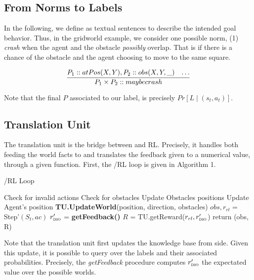 \subsection{From Norms to Labels}
In the following, we define \textbf{} as textual sentences to describe the intended goal behavior. 
Thus, in the gridworld example, we consider one possible norm, (1) \textit{crash} when the agent and the obstacle \emph{possibly} overlap. That is if there is a chance of 
the obstacle and the agent choosing to move to the same square. 

\[
    \infer{P_1 \times P_2 :: maybecrash}{P_1::atPos(X,Y), P_2::obs(X,Y,\_)
      & \ldots}
\] 

Note that the final $P$ associated to our label, is precisely $Pr[L \mid (s_t, a_t)]$. 

\subsection{Translation Unit}
The translation unit is the bridge between \dio{} and RL. Precisely, it handles both feeding 
the world facts to \dio{} and translates the feedback given to a numerical value, through 
a given function. First, the \dio{}/RL loop is given in Algorithm 1. 

  \begin{algorithm}[H]
    \caption{\dio{}/RL Loop}
    \begin{algorithmic}[1]
    
           
        \State Check for invalid actions
        \State Check for obstacles 
        \State Update Obstacles positions
        \State Update Agent's position
        \State \textbf{TU.UpdateWorld}(position, direction, obstacles) 
        \State $obs, r_{rl}$ = Step'$(S_t, ac)$ 
        \State $r_{\textsc{dio}{}}'$ = \textbf{getFeedback()} 
        \State $R$ = TU.getReward($r_{rl}, r_{\textsc{dio}{}}'$) 
        \State return (obs, R)
    \EndProcedure
    
    \end{algorithmic}
    \end{algorithm}

Note that the translation unit first updates the knowledge base from \dio{} side. 
Given this update, it is possible to query \dio{} over the labels and their associated probabilities. Precisely, 
the \emph{getFeedback} procedure computes $r'_{\textsc{dio}{}}$ the expectated value over the possible worlds. 

